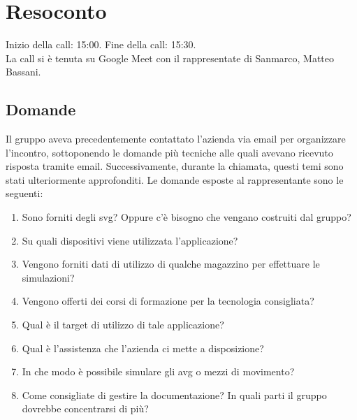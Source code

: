 \section{Resoconto}
Inizio della call: 15:00. Fine della call: 15:30. \\
La call si è tenuta su Google Meet con il rappresentate di Sanmarco, Matteo Bassani.
\subsection{Domande}
Il gruppo aveva precedentemente contattato l'azienda via email per organizzare l'incontro, sottoponendo le domande più tecniche alle quali avevano ricevuto risposta tramite email. Successivamente, durante la chiamata, questi temi sono stati ulteriormente approfonditi.
Le domande esposte al rappresentante sono le seguenti:

\begin{enumerate}
    \item Sono forniti degli svg? Oppure c'è bisogno che vengano costruiti dal gruppo?
    \item Su quali dispositivi viene utilizzata l'applicazione?
    \item Vengono forniti dati di utilizzo di qualche magazzino per effettuare le simulazioni?
    \item Vengono offerti dei corsi di formazione per la tecnologia consigliata?
    \item Qual è il target di utilizzo di tale applicazione?
    \item Qual è l'assistenza che l'azienda ci mette a disposizione?
    \item In che modo è possibile simulare gli avg o mezzi di movimento?
    \item Come consigliate di gestire la documentazione? In quali parti il gruppo dovrebbe concentrarsi di più?
\end{enumerate}

